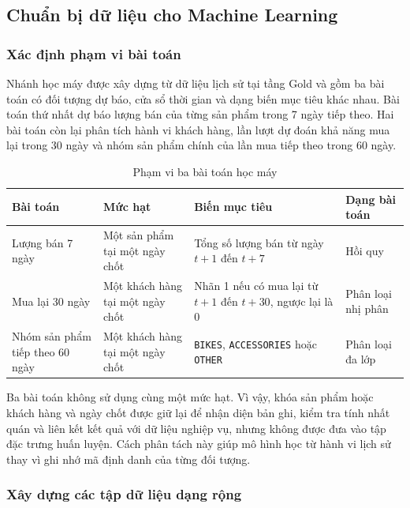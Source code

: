 

\subsection{Chuẩn bị dữ liệu cho Machine Learning}

\subsubsection{Xác định phạm vi bài toán}

Nhánh học máy được xây dựng từ dữ liệu lịch sử tại tầng Gold và gồm ba bài toán có đối tượng dự báo, cửa sổ thời gian và dạng biến mục tiêu khác nhau. Bài toán thứ nhất dự báo lượng bán của từng sản phẩm trong 7 ngày tiếp theo. Hai bài toán còn lại phân tích hành vi khách hàng, lần lượt dự đoán khả năng mua lại trong 30 ngày và nhóm sản phẩm chính của lần mua tiếp theo trong 60 ngày.

\begin{table}[H]\centering
\caption{Phạm vi ba bài toán học máy}
\label{tab:ml-problems}
\begin{tabularx}{\textwidth}{|p{3.2cm}|p{3.4cm}|p{3.7cm}|X|}\hline
\textbf{Bài toán} & \textbf{Mức hạt} & \textbf{Biến mục tiêu} & \textbf{Dạng bài toán} \\ \hline
Lượng bán 7 ngày & Một sản phẩm tại một ngày chốt & Tổng số lượng bán từ ngày $t+1$ đến $t+7$ & Hồi quy \\ \hline
Mua lại 30 ngày & Một khách hàng tại một ngày chốt & Nhãn 1 nếu có mua lại từ $t+1$ đến $t+30$, ngược lại là 0 & Phân loại nhị phân \\ \hline
Nhóm sản phẩm tiếp theo 60 ngày & Một khách hàng tại một ngày chốt & \texttt{BIKES}, \texttt{ACCESSORIES} hoặc \texttt{OTHER} & Phân loại đa lớp \\ \hline
\end{tabularx}
\end{table}

Ba bài toán không sử dụng cùng một mức hạt. Vì vậy, khóa sản phẩm hoặc khách hàng và ngày chốt được giữ lại để nhận diện bản ghi, kiểm tra tính nhất quán và liên kết kết quả với dữ liệu nghiệp vụ, nhưng không được đưa vào tập đặc trưng huấn luyện. Cách phân tách này giúp mô hình học từ hành vi lịch sử thay vì ghi nhớ mã định danh của từng đối tượng.

\subsubsection{Xây dựng các tập dữ liệu dạng rộng}

